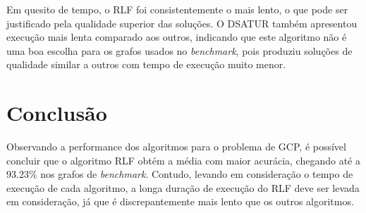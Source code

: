 \documentclass[10pt, twocolumn]{article}
\begin{document}
Em quesito de tempo, o RLF foi consistentemente o mais lento, o que pode ser
justificado pela qualidade superior das soluções.
O DSATUR também apresentou execução mais lenta comparado aos outros, indicando
que este algoritmo não é uma boa escolha para os grafos usados no \emph{benchmark},
pois produziu soluções de qualidade similar a outros com tempo de execução muito menor.



\section{Conclusão}
Observando a performance dos algoritmos para o problema de GCP, é possível concluir
que o algoritmo RLF obtém a média com maior acurácia, chegando até a $93.23\%$ nos
grafos de \emph{benchmark}. Contudo, levando em consideração o tempo de execução
de cada algoritmo, a longa duração de execução do RLF deve ser levada em consideração,
já que é discrepantemente mais lento que os outros algoritmos.




\end{document}
